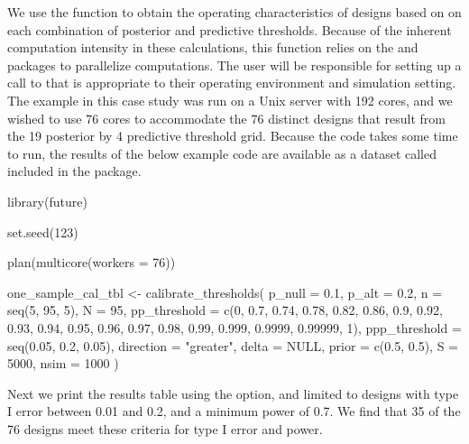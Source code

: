 We use the  function to obtain the
operating characteristics of designs based on on each combination of
posterior and predictive thresholds. Because of the inherent computation
intensity in these calculations, this function relies on the
 \citep{Bengtsson2020} and 
\citep{Vaughan2021} packages to parallelize computations. The user will
be responsible for setting up a call to  that is
appropriate to their operating environment and simulation setting. The
example in this case study was run on a Unix server with 192 cores, and
we wished to use 76 cores to accommodate the 76 distinct designs that
result from the 19 posterior by 4 predictive threshold grid. Because the
code takes some time to run, the results of the below example code are
available as a dataset called  included in
the  package.

\begin{Schunk}
\begin{Sinput}
library(future)

set.seed(123)

plan(multicore(workers = 76))

one_sample_cal_tbl <- 
  calibrate_thresholds(
    p_null = 0.1, 
    p_alt = 0.2, 
    n = seq(5, 95, 5),
    N = 95, 
    pp_threshold = c(0, 0.7, 0.74, 0.78, 0.82, 0.86, 0.9, 0.92, 0.93, 0.94, 
                     0.95, 0.96, 0.97, 0.98, 0.99, 0.999, 0.9999, 0.99999, 1),
    ppp_threshold = seq(0.05, 0.2, 0.05),
    direction = "greater", 
    delta = NULL, 
    prior = c(0.5, 0.5), 
    S = 5000, 
    nsim = 1000
    )
\end{Sinput}
\end{Schunk}

Next we print the results table using the  option, and
limited to designs with type I error between 0.01 and 0.2, and a minimum
power of 0.7. We find that 35 of the 76 designs meet these criteria for
type I error and power.

